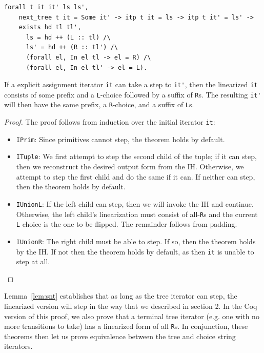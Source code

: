 \documentclass[a4paper,english]{lipics-v2019}
\renewcommand{\L}{{\tt L}\xspace}
\newcommand{\Ls}{{\tt L}s\xspace}
\newcommand{\R}{{\tt R}\xspace}
\newcommand{\Rs}{{\tt R}s\xspace}
\begin{document}
\begin{lemma}
\label{lem:snt}
\begin{small}\begin{verbatim}
forall t it it' ls ls',
    next_tree t it = Some it' -> itp t it = ls -> itp t it' = ls' ->
    exists hd tl tl',
      ls = hd ++ (L :: tl) /\
      ls' = hd ++ (R :: tl') /\
      (forall el, In el tl -> el = R) /\
      (forall el, In el tl' -> el = L).
\end{verbatim}\end{small}
If a explicit assignment iterator \verb|it| can take a step to \verb|it'|, then
the linearized \verb|it| consists of some prefix and a \L-choice followed by a suffix of \Rs.
The resulting \verb|it'| will then have the same prefix, a \R-choice, and a suffix of \Ls.
\end{lemma}
\begin{proof}
The proof follows from induction over the initial iterator \verb|it|:
\begin{itemize}
    \item \verb|IPrim|: Since primitives cannot step, the theorem holds by default.
    \item \verb|ITuple|: We first attempt to step the second child of the tuple; if it can step, then 
    we reconstruct the desired output form from the IH. Otherwise, we attempt to step the first child and
    do the same if it can. If neither can step, then the theorem holds by default.
    \item \verb|IUnionL|: If the left child can step, then we will invoke the IH and continue. Otherwise,
    the left child's linearization must consist of all-\Rs and the current \L choice is the one to be flipped. 
    The remainder follows from padding.
    \item \verb|IUnionR|: The right child must be able to step. If so, then the theorem holds by the IH.
    If not then the theorem holds by default, as then \verb|it| is unable to step at all.
\end{itemize}
\end{proof}

Lemma~\ref{lem:snt} establishes that as long as the tree iterator can step, the linearized
version will step in the way that we described in section 2. In the Coq version of this proof, we also
prove that a terminal tree iterator (e.g. one with no more transitions to take) has a linearized
form of all \Rs. In conjunction, these theorems then let us prove equivalence between the tree and
choice string iterators.
\end{document}
